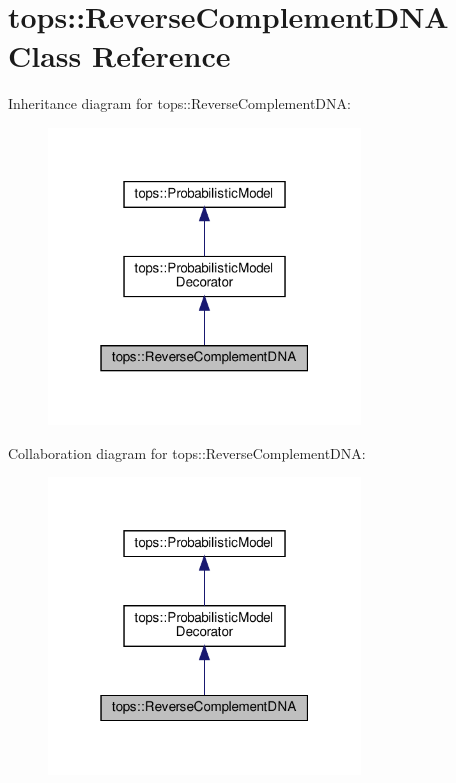 \hypertarget{classtops_1_1ReverseComplementDNA}{}\section{tops\+:\+:Reverse\+Complement\+D\+NA Class Reference}
\label{classtops_1_1ReverseComplementDNA}


Inheritance diagram for tops\+:\+:Reverse\+Complement\+D\+NA\+:
\nopagebreak
\begin{figure}[H]
\begin{center}
\leavevmode
\includegraphics[width=235pt]{classtops_1_1ReverseComplementDNA__inherit__graph}
\end{center}
\end{figure}


Collaboration diagram for tops\+:\+:Reverse\+Complement\+D\+NA\+:
\nopagebreak
\begin{figure}[H]
\begin{center}
\leavevmode
\includegraphics[width=235pt]{classtops_1_1ReverseComplementDNA__coll__graph}
\end{center}
\end{figure}
